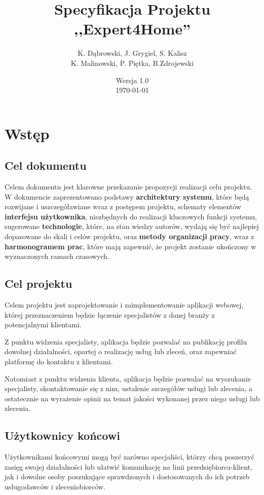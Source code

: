 \documentclass[10pt, titlepage, oneside, a4paper]{article}
\title{Specyfikacja Projektu ,,Expert4Home''}
\author{K. Dąbrowski, J. Grygiel, S. Kalisz\\
K. Malinowski, P. Piętka, B.Zdrojewski}
\date{Wersja 1.0\\\today}
\begin{document}
	\maketitle
	\thispagestyle{empty}  
	\newpage
  
	\section{Wstęp} 
  
	\subsection{Cel dokumentu}
	Celem dokumentu jest klarowne przekazanie propozycji realizacji celu projektu. W dokumencie zaprezentowano podstawy \textbf{architektury systemu}, które będą rozwijane i uszczegóławiane wraz z postępem projektu, schematy elementów \textbf{interfejsu użytkownika}, niezbędnych do realizacji kluczowych funkcji systemu, sugerowane \textbf{technologie}, które, na stan wiedzy autorów, wydają się być najlepiej dopasowane do skali i celów projektu, oraz \textbf{metody organizacji pracy}, wraz z \textbf{harmonogramem prac}, które mają zapewnić, że projekt zostanie ukończony w wyznaczonych ramach czasowych.
  
	\subsection{Cel projektu}
	
	Celem projektu jest zaprojektowanie i zaimplementowanie aplikacji webowej, której przeznaczeniem będzie łączenie specjalistów z danej branży z potencjalnymi klientami. 
	
	Z punktu widzenia specjalisty, aplikacja będzie pozwalać na publikację profilu dowolnej działalności, opartej o realizację usług lub zleceń, oraz zapewniać platformę do kontaktu z klientami.
	
	Natomiast z punktu widzenia klienta, aplikacja będzie pozwalać na wyszukanie specjalisty, skontaktowanie się z nim, ustalenie szczegółów usługi lub zlecenia, a ostatecznie na wyrażenie opinii na temat jakości wykonanej przez niego usługi lub zlecenia.
  
	\subsection{Użytkownicy końcowi}
	Użytkownikami końcowymi mogą być zarówno specjaliści, którzy chcą poszerzyć zasięg swojej działalności lub ułatwić komunikację na linii przedsiębiorca-klient, jak i dowolne osoby poszukujące sprawdzonych i dostosowanych do ich potrzeb usługodawców i zleceniobiorców.
	\newpage  
  
\end{document}
